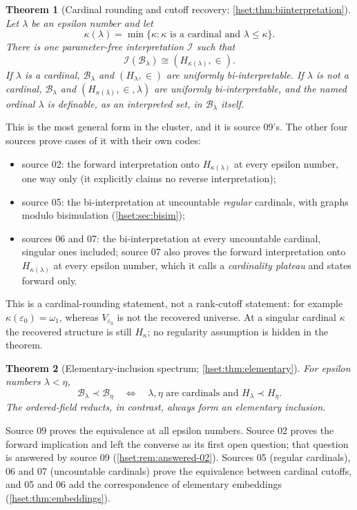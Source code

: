 \documentclass[11pt,letterpaper]{article}
\newtheorem{theorem}{Theorem}[section]
\theoremstyle{definition}
\theoremstyle{remark}
\newcommand{\B}{\mathcal B}
\newcommand{\I}{\mathcal I}
\newcommand{\ceilcard}[1]{\kappa(#1)}
\begin{document}
\begin{theorem}[Cardinal rounding and cutoff recovery; \cref{hset:thm:biinterpretation}]
\label{hset:thm:main-rounding}
Let $\lambda$ be an epsilon number and let
\[
 \ceilcard{\lambda}=\min\{\kappa:\kappa\text{ is a cardinal and }\lambda\le\kappa\}.
\]
There is one parameter-free interpretation $\I$ such that
\[
 \I(\B_\lambda)\cong(H_{\ceilcard{\lambda}},\in).
\]
If $\lambda$ is a cardinal, $\B_\lambda$ and $(H_\lambda,\in)$ are uniformly
bi-interpretable. If $\lambda$ is not a cardinal, $\B_\lambda$ and
$(H_{\ceilcard{\lambda}},\in,\lambda)$ are uniformly bi-interpretable, and the
named ordinal $\lambda$ is definable, as an interpreted set, in $\B_\lambda$
itself.
\end{theorem}

This is the most general form in the cluster, and it is source 09's. The other
four sources prove cases of it with their own codes:
\begin{itemize}
\item source 02: the forward interpretation onto $H_{\kappa(\lambda)}$ at every
epsilon number, one way only (it explicitly claims no reverse interpretation);
\item source 05: the bi-interpretation at uncountable \emph{regular} cardinals,
with graphs modulo bisimulation (\cref{hset:sec:bisim});
\item sources 06 and 07: the bi-interpretation at every uncountable cardinal,
singular ones included; source 07 also proves the forward interpretation onto
$H_{\kappa(\lambda)}$ at every epsilon number, which it calls a
\emph{cardinality plateau} and states forward only.
\end{itemize}
This is a cardinal-rounding statement, not a rank-cutoff statement: for
example $\kappa(\varepsilon_0)=\omega_1$, whereas $V_{\varepsilon_0}$ is not
the recovered universe. At a singular cardinal $\kappa$ the recovered structure
is still $H_\kappa$; no regularity assumption is hidden in the theorem.

\begin{theorem}[Elementary-inclusion spectrum; \cref{hset:thm:elementary}]
\label{hset:thm:main-elementary}
For epsilon numbers $\lambda<\eta$,
\[
 \B_\lambda\prec\B_\eta
 \quad\Longleftrightarrow\quad
 \lambda,\eta\text{ are cardinals and }H_\lambda\prec H_\eta.
\]
The ordered-field reducts, in contrast, always form an elementary inclusion.
\end{theorem}

Source 09 proves the equivalence at all epsilon numbers. Source 02 proves the
forward implication and left the converse as its first open question; that
question is answered by source 09 (\cref{hset:rem:answered-02}). Sources 05
(regular cardinals), 06 and 07 (uncountable cardinals) prove the equivalence
between cardinal cutoffs, and 05 and 06 add the correspondence of elementary
embeddings (\cref{hset:thm:embeddings}).
\end{document}
